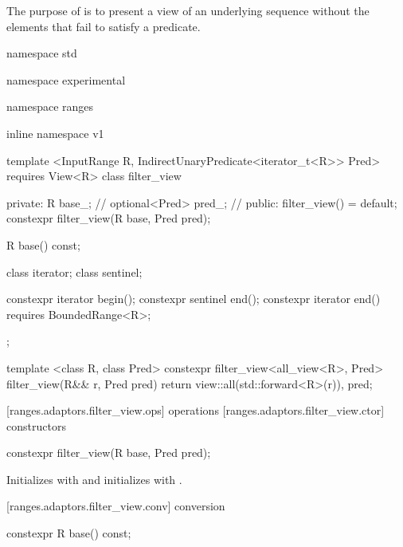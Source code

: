 \pnum
The purpose of  is to present a view of an underlying
sequence without the elements that fail to satisfy a predicate.

\pnum
\enterexample
{}
\exitexample

\begin{codeblock}
namespace std { namespace experimental { namespace ranges { inline namespace v1 {
  template <InputRange R, IndirectUnaryPredicate<iterator_t<R>> Pred>
    requires View<R>
  class filter_view {
  private:
    R base_; // \expos
    optional<Pred> pred_; // \expos
  public:
    filter_view() = default;
    constexpr filter_view(R base, Pred pred);

    R base() const;

    class iterator;
    class sentinel;

    constexpr iterator begin();
    constexpr sentinel end();
    constexpr iterator end() requires BoundedRange<R>;
  };

  template <class R, class Pred>
  constexpr filter_view<all_view<R>, Pred> filter_view(R&& r, Pred pred) {
    return {view::all(std::forward<R>(r)), pred};
  }
}}}}
\end{codeblock}

[ranges.adaptors.filter_view.ops]{ operations}
[ranges.adaptors.filter_view.ctor]{ constructors}

%
\begin{itemdecl}
constexpr filter_view(R base, Pred pred);
\end{itemdecl}

\begin{itemdescr}
\pnum
\effects Initializes  with  and initializes
 with .
\end{itemdescr}

[ranges.adaptors.filter_view.conv]{ conversion}

%
\begin{itemdecl}
constexpr R base() const;
\end{itemdecl}


